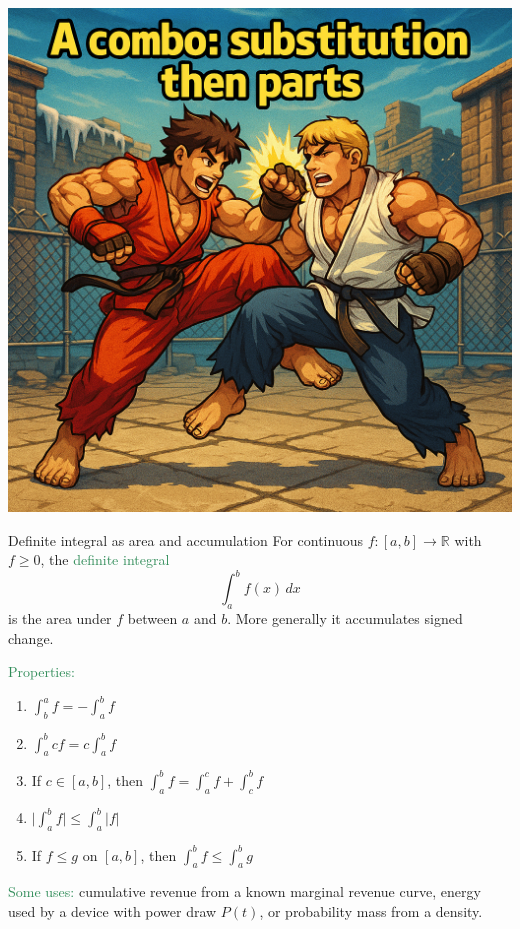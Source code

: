 \documentclass[11pt,aspectratio=169]{beamer}
\begin{document}
\begin{frame}[plain]{}
	\centering\includegraphics[scale=.25]{vbreaks/combo}
\end{frame}





\begin{frame}{Definite integral as area and accumulation}
For continuous $f:[a,b]\to\mathbb{R}$ with $f\ge 0$, the \textcolor{SeaGreen}{definite integral}
\[
\int_a^b f(x)\,dx
\]
is the area under $f$ between $a$ and $b$. More generally it accumulates signed change.
\bigskip

\textcolor{SeaGreen}{Properties:}
\begin{enumerate}
\item $\int_b^a f=-\int_a^b f$
\item $\int_a^b c f=c\int_a^b f$
\item If $c\in[a,b]$, then $\int_a^b f=\int_a^c f+\int_c^b f$
\item $\Big|\int_a^b f\Big|\le \int_a^b |f|$
\item If $f\le g$ on $[a,b]$, then $\int_a^b f\le \int_a^b g$
\end{enumerate}

\bigskip
\textcolor{SeaGreen}{Some uses:} cumulative revenue from a known marginal revenue curve, energy used by a device with power draw $P(t)$, or probability mass from a density.
\end{frame}
\end{document}
